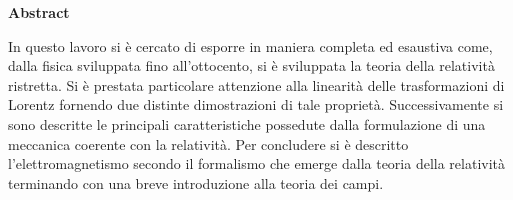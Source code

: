 \vspace*{10pt}
\begin{center}
	\large\textbf{Abstract}\normalsize
\end{center}
\vspace*{10pt}
\begin{changemargin}{1cm}{1cm}
In questo lavoro si è cercato di esporre in maniera completa ed esaustiva come, dalla fisica sviluppata fino all'ottocento, si è sviluppata la teoria della relatività ristretta. Si è prestata particolare attenzione alla linearità delle trasformazioni di Lorentz fornendo due distinte dimostrazioni di tale proprietà. Successivamente si sono descritte le principali caratteristiche possedute dalla formulazione di una meccanica coerente con la relatività. Per concludere si è descritto l'elettromagnetismo secondo il formalismo che emerge dalla teoria della relatività terminando con una breve introduzione alla teoria dei campi.
\end{changemargin}